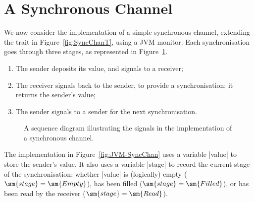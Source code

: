 \section{A Synchronous Channel}

We now consider the implementation of a simple synchronous channel, extending
the trait in Figure~\ref{fig:SyncChanT}, using a JVM monitor.  Each
synchronisation goes through three stages, as represented in
Figure~\ref{fig:JVM-syncChan-seqDiagram}.
%
\begin{enumerate}
\item The sender  deposits its value, and signals to a receiver;

\item The receiver signals back to the sender, to provide a
  synchronisation; it returns the sender's value; 

\item The sender signals to a sender for the next synchronisation.
\end{enumerate}


\begin{figure}
\begin{center}
\def\height{5.2}
\end{center}
\caption{A sequence diagram illustrating the signals in the implementation of
  a synchronous channel.}
\label{fig:JVM-syncChan-seqDiagram}
\end{figure}


The implementation in Figure~\ref{fig:JVM-SyncChan} uses a variable |value| to
store the sender's value.  It also uses a variable |stage| to record the
current stage of the synchronisation: whether |value| is (logically) empty
($\sm{stage} = \sm{Empty}$), has been filled ($\sm{stage} = \sm{Filled}$), or
has been read by the receiver ($\sm{stage} = \sm{Read}$).

